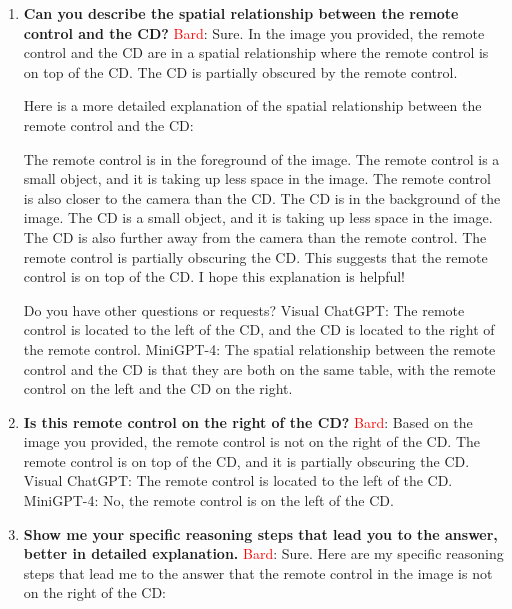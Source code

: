 \begin{enumerate}
    \item \textbf{Can you describe the spatial relationship between the remote control and the CD?}
    \subitem \textcolor{Red}{Bard}: 
    Sure. In the image you provided, the remote control and the CD are in a spatial relationship where the remote control is on top of the CD. The CD is partially obscured by the remote control.
    
    Here is a more detailed explanation of the spatial relationship between the remote control and the CD:
    
    The remote control is in the foreground of the image. The remote control is a small object, and it is taking up less space in the image. The remote control is also closer to the camera than the CD.
    The CD is in the background of the image. The CD is a small object, and it is taking up less space in the image. The CD is also further away from the camera than the remote control.
    The remote control is partially obscuring the CD. This suggests that the remote control is on top of the CD.
    I hope this explanation is helpful!
    
    Do you have other questions or requests?
    \subitem Visual ChatGPT: The remote control is located to the left of the CD, and the CD is located to the right of the remote control.
    \subitem MiniGPT-4: The spatial relationship between the remote control and the CD is that they are both on the same table, with the remote control on the left and the CD on the right.
    \item \textbf{Is this remote control on the right of the CD?}
    \subitem \textcolor{Red}{Bard}: Based on the image you provided, the remote control is not on the right of the CD. The remote control is on top of the CD, and it is partially obscuring the CD.
    \subitem Visual ChatGPT: The remote control is located to the left of the CD.
    \subitem MiniGPT-4: No, the remote control is on the left of the CD.
    \item \textbf{Show me your specific reasoning steps that lead you to the answer, better in detailed explanation.}
    \subitem \textcolor{Red}{Bard}: 
    Sure. Here are my specific reasoning steps that lead me to the answer that the remote control in the image is not on the right of the CD:
    

\end{enumerate}
